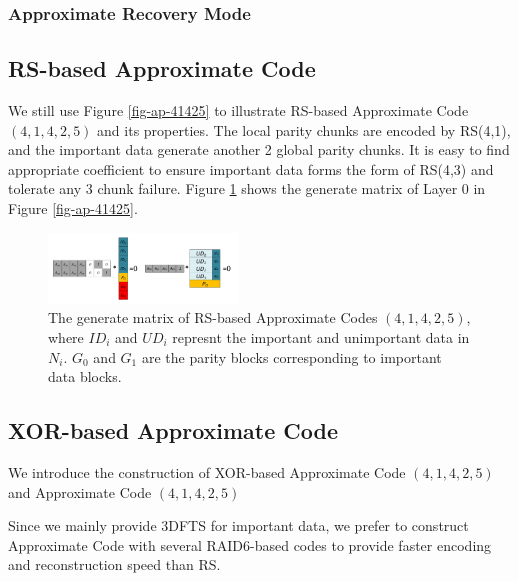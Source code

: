 \documentclass[sigconf]{acmart}
\begin{document}
\subsubsection{Approximate Recovery Mode}
\fi

\subsection{RS-based Approximate Code}
We still use Figure \ref{fig-ap-41425} to illustrate RS-based Approximate Code $(4,1,4,2,5)$ and its properties. The local parity chunks are encoded by RS(4,1), and the important data generate another 2 global parity chunks. It is easy to find appropriate coefficient to ensure important data forms the form of RS(4,3) and tolerate any 3 chunk failure. Figure \ref{fig-ap-rs} shows the generate matrix of Layer 0 in Figure \ref{fig-ap-41425}.

\begin{figure}[h]
\centering
\includegraphics[width=0.45\textwidth]{photo/AP-RS-43.pdf}
\caption{The generate matrix of RS-based Approximate Codes $(4,1,4,2,5)$, where $ID_i$ and $UD_i$ represnt the important and unimportant data in $N_i$. $G_0$ and $G_1$ are the parity blocks corresponding to important data blocks.}
\label{fig-ap-rs}
\end{figure}

\subsection{XOR-based Approximate Code}
We introduce the construction of XOR-based Approximate Code $(4,1,4,2,5)$ and Approximate Code $(4,1,4,2,5)$

Since we mainly provide 3DFTS for important data, we prefer to construct Approximate Code with several RAID6-based codes to provide faster encoding and reconstruction speed than RS.
\end{document}

